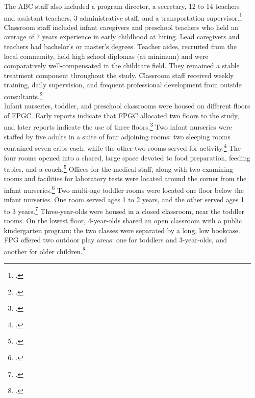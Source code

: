 \begin{appendices}
\noindent The ABC staff also included a program director, a secretary, 12 to 14 teachers and assistant teachers, 3 administrative staff, and a transportation supervisor.\footnote{\citet{Ramey-et-al_1977_Intro-to-ABC,Ramey_McGinness_etal_1982_Abecedarianapproach}.} Classroom staff included infant caregivers and preschool teachers who held an average of 7 years experience in early childhood at hiring. Lead caregivers and teachers had bachelor's or master's degrees. Teacher aides, recruited from the local community, held high school diplomas (at minimum) and were comparatively well-compensated in the childcare field. They remained a stable treatment component throughout the study. Classroom staff received weekly training, daily supervision, and frequent professional development from outside consultants.\footnote{\citet{Obrien-Sanders_1974_ABC-brochure,Sanders-Stokes_1979_Status-Report,Klein-Sanders_1982_Status-Report,abc2014-2015interviews}.}\\

\noindent Infant nurseries, toddler, and preschool classrooms were housed on different floors of FPGC. Early reports indicate that FPGC allocated two floors to the study, and later reports indicate the use of three floors.\footnote{\citet{Ramey_Smith_1977_AJMD,Ramey_Campbell_1979_SR,Ramey_1981_Modification}.} Two infant nurseries were staffed by five adults in a suite of four adjoining rooms: two sleeping rooms contained seven cribs each, while the other two rooms served for activity.\footnote{ \citet{Ramey-et-al_1977_Intro-to-ABC}.} The four rooms opened into a shared, large space devoted to food preparation, feeding tables, and a couch.\footnote{\citet{Ramey_Campbell_1979_SR}.} Offices for the medical staff, along with two examining rooms and facilities for laboratory tests were located around the corner from the infant nurseries.\footnote{\citet{abc2014-2015interviews}.} Two multi-age toddler rooms were located one floor below the infant nurseries. One room served ages 1 to 2 years, and the other served ages 1 to 3 years.\footnote{\citet{Ramey_Smith_1977_AJMD,Ramey_Campbell_1979_SR}.} Three-year-olds were housed in a closed classroom, near the toddler rooms. On the lowest floor, 4-year-olds shared an open classroom with a public kindergarten program; the two classes were separated by a long, low bookcase. FPG offered two outdoor play areas: one for toddlers and 3-year-olds, and another for older children.\footnote{\citet{Ramey_Campbell_1979_SR,Ramey_McGinness_etal_1982_Abecedarianapproach}.}\\


\end{appendices}
